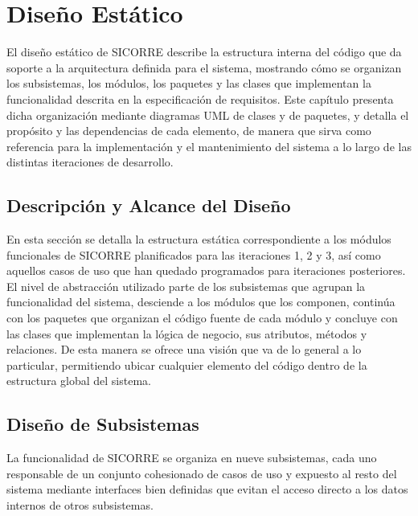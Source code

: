 \chapter{Diseño Estático}

El diseño estático de SICORRE describe la estructura interna del código que da soporte a la
arquitectura definida para el sistema, mostrando cómo se organizan los subsistemas, los
módulos, los paquetes y las clases que implementan la funcionalidad descrita en la
especificación de requisitos. Este capítulo presenta dicha organización mediante diagramas
UML de clases y de paquetes, y detalla el propósito y las dependencias de cada elemento,
de manera que sirva como referencia para la implementación y el mantenimiento del sistema
a lo largo de las distintas iteraciones de desarrollo.

\section{Descripción y Alcance del Diseño}

En esta sección se detalla la estructura estática correspondiente a los módulos funcionales
de SICORRE planificados para las iteraciones 1, 2 y 3, así como aquellos casos de uso que
han quedado programados para iteraciones posteriores. El nivel de abstracción utilizado
parte de los subsistemas que agrupan la funcionalidad del sistema, desciende a los módulos
que los componen, continúa con los paquetes que organizan el código fuente de cada módulo
y concluye con las clases que implementan la lógica de negocio, sus atributos, métodos y
relaciones. De esta manera se ofrece una visión que va de lo general a lo particular,
permitiendo ubicar cualquier elemento del código dentro de la estructura global del sistema.

\section{Diseño de Subsistemas}

La funcionalidad de SICORRE se organiza en nueve subsistemas, cada uno responsable de un conjunto cohesionado de casos de uso y expuesto al resto del sistema mediante interfaces bien definidas que evitan el acceso directo a los datos internos de otros subsistemas.

